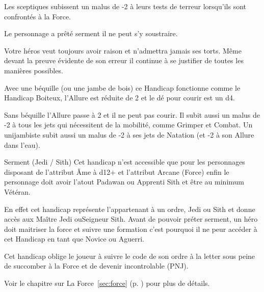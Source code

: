 \begin{description}[align=left]
        Les sceptiques subissent un malus de -2 à leurs tests de terreur lorsqu'ils sont confrontés à la Force.

    \item [Serment (Jedi ou Sith) (Majeur)]
        Le personnage a prêté serment il ne peut s'y soustraire.

    \item [Têtu (Mineur)]
        Votre héros veut toujours avoir raison et n'admettra jamais ses torts. Même devant la preuve évidente de son erreur il continue à se justifier de toutes les manières possibles.

    \item [Unijambiste (Majeur)]
        Avec une béquille (ou une jambe de bois) ce Handicap fonctionne comme le Handicap Boiteux, l'Allure est réduite de 2 et le dé pour courir est un d4.

        Sans béquille l'Allure passe à 2 et il ne peut pas courir. Il subit aussi un malus de -2 à tous les jets qui nécessitent de la mobilité, comme Grimper et Combat. Un unijambiste subit aussi un malus de -2 à ses jets de Natation (et -2 à son Allure dans l'eau).

\end{description}

\begin{paperbox}{Serment (Jedi / Sith)}
    Cet handicap n'est accessible que pour les personnages disposant de l'attribut \^Ame à d12+ et l'attribut Arcane (Force) enfin le personnage doit avoir l'atout Padawan ou Apprenti Sith et être au minimum Vétéran. 

    En effet cet handicap représente l'appartenant à un ordre, Jedi ou Sith et donne accès aux Maître Jedi ouSeigneur Sith. Avant de pouvoir préter serment, un héro doit maitriser la force et suivre une formation c'est pourquoi il ne peur accéder à cet Handicap en tant que Novice ou Aguerri.

    Cet handicap oblige le joueur à suivre le code de son ordre à la letter sous peine de succomber à la Force et de devenir incontrolable (PNJ).

    Voir le chapitre sur La Force~\ref{sec:force} (p. \pageref{sec:force}) pour plus de détails.
\end{paperbox}

